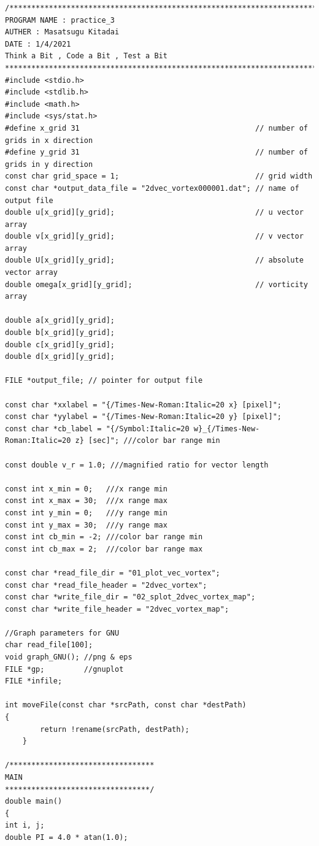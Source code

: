 \documentclass[12pt,a4paper]{jsarticle}
\begin{document}
\begin{lstlisting}
/******************************************************************************
PROGRAM NAME : practice_3
AUTHER : Masatsugu Kitadai
DATE : 1/4/2021
Think a Bit , Code a Bit , Test a Bit
******************************************************************************/
#include <stdio.h>
#include <stdlib.h>
#include <math.h>
#include <sys/stat.h>
#define x_grid 31                                        // number of grids in x direction
#define y_grid 31                                        // number of grids in y direction
const char grid_space = 1;                               // grid width
const char *output_data_file = "2dvec_vortex000001.dat"; // name of output file
double u[x_grid][y_grid];                                // u vector array
double v[x_grid][y_grid];                                // v vector array
double U[x_grid][y_grid];                                // absolute vector array
double omega[x_grid][y_grid];                            // vorticity array

double a[x_grid][y_grid];
double b[x_grid][y_grid];
double c[x_grid][y_grid];
double d[x_grid][y_grid];

FILE *output_file; // pointer for output file

const char *xxlabel = "{/Times-New-Roman:Italic=20 x} [pixel]";
const char *yylabel = "{/Times-New-Roman:Italic=20 y} [pixel]";
const char *cb_label = "{/Symbol:Italic=20 w}_{/Times-New-Roman:Italic=20 z} [sec]"; ///color bar range min

const double v_r = 1.0; ///magnified ratio for vector length

const int x_min = 0;   ///x range min
const int x_max = 30;  ///x range max
const int y_min = 0;   ///y range min
const int y_max = 30;  ///y range max
const int cb_min = -2; ///color bar range min
const int cb_max = 2;  ///color bar range max

const char *read_file_dir = "01_plot_vec_vortex";
const char *read_file_header = "2dvec_vortex";
const char *write_file_dir = "02_splot_2dvec_vortex_map";
const char *write_file_header = "2dvec_vortex_map";

//Graph parameters for GNU
char read_file[100];
void graph_GNU(); //png & eps
FILE *gp;         //gnuplot
FILE *infile;

int moveFile(const char *srcPath, const char *destPath)
{
        return !rename(srcPath, destPath);
    }

/*********************************
MAIN
*********************************/
double main()
{
int i, j;
double PI = 4.0 * atan(1.0);


\end{lstlisting}
\end{document}
